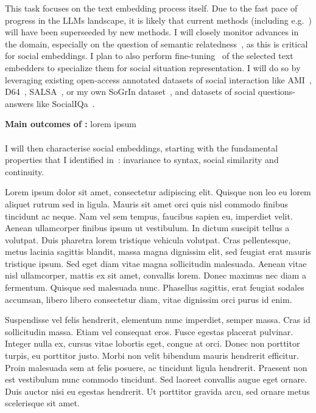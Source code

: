 This task focuses on the text embedding process itself. Due to the fast pace of
progress in the LLMs landscape, it is likely that current methods (including
e.g.~\cite{reimers2019sentencebert,muennighoff2022sgpt}) will have been
superseeded by new methods. I will closely monitor advances in the domain,
especially on the question of semantic relatedness~\cite{thakur2021beir}, as
this is critical for social embeddings. I plan to also perform
fine-tuning~\cite{hadsell2006dimensionality} of the selected text embedders to
specialize them for social situation representation. I will do so by leveraging
existing open-access annotated datasets of social interaction like
AMI~\cite{carletta2007ami}, D64~\cite{oertel2013d64},
SALSA~\cite{alameda2015salsa}, or my own SoGrIn dataset~\cite{webb2023sogrin},
and datasets of social questions-answers like SocialIQa~\cite{sap2019social}.

\begin{framed}
    {\noindent\bf Main outcomes of \tAB:} lorem ipsum 
\end{framed}

    \paragraph{\TAC}

I will then characterise social embeddings, starting with the fundamental
properties that I identified in~\cite{lemaignan2024social}: invariance to
syntax, social similarity and continuity. 

\begin{rewrite}
Lorem ipsum dolor sit amet, consectetur adipiscing elit. Quisque non leo eu
lorem aliquet rutrum sed in ligula. Mauris sit amet orci quis nisl commodo
finibus tincidunt ac neque. Nam vel sem tempus, faucibus sapien eu,
imperdiet velit. Aenean ullamcorper finibus ipsum ut vestibulum. In dictum
suscipit tellus a volutpat. Duis pharetra lorem tristique vehicula volutpat.
Cras pellentesque, metus lacinia sagittis blandit, massa magna dignissim
elit, sed feugiat erat mauris tristique ipsum. Sed eget diam vitae magna
sollicitudin malesuada. Aenean vitae nisl ullamcorper, mattis ex sit amet,
convallis lorem. Donec maximus nec diam a fermentum. Quisque sed malesuada
nunc. Phasellus sagittis, erat feugiat sodales accumsan, libero libero
consectetur diam, vitae dignissim orci purus id enim.

Suspendisse vel felis hendrerit, elementum nunc imperdiet, semper massa. Cras id
sollicitudin massa. Etiam vel consequat eros. Fusce egestas placerat
pulvinar. Integer nulla ex, cursus vitae lobortis eget, congue at orci.
Donec non porttitor turpis, eu porttitor justo. Morbi non velit bibendum
mauris hendrerit efficitur. Proin malesuada sem at felis posuere, ac
tincidunt ligula hendrerit. Praesent non est vestibulum nunc commodo
tincidunt. Sed laoreet convallis augue eget ornare. Duis auctor nisi eu
egestas hendrerit. Ut porttitor gravida arcu, sed ornare metus scelerisque
sit amet. 
\end{rewrite}



